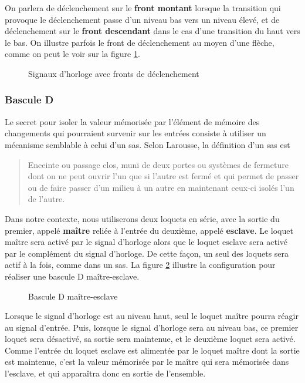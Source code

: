 \documentclass[11pt]{article}
\begin{document}
On parlera de déclenchement sur le \textbf{front montant} lorsque la
transition qui provoque le déclenchement passe d'un niveau bas vers un
niveau élevé, et de déclenchement sur le \textbf{front descendant} dans le
cas d'une transition du haut vers le bas.  On illustre parfois le
front de déclenchement au moyen d'une flèche, comme on peut le voir
sur la figure \ref{fig:org8dda642}.

\begin{figure}[htbp]
\centering

\caption{\label{fig:org8dda642}Signaux d'horloge avec fronts de déclenchement}
\end{figure}

\subsubsection{Bascule D}
\label{sec:orga245299}

Le secret pour isoler la valeur mémorisée par l'élément de mémoire des
changements qui pourraient survenir sur les entrées consiste à
utiliser un mécanisme semblable à celui d'un sas. Selon Larousse, la
définition d'un sas est

\begin{quote}
Enceinte ou passage clos, muni de deux portes ou systèmes de fermeture
dont on ne peut ouvrir l'un que si l'autre est fermé et qui permet de
passer ou de faire passer d'un milieu à un autre en maintenant ceux-ci
isolés l'un de l'autre.
\end{quote}

Dans notre contexte, nous utiliserons deux loquets en série, avec la
sortie du premier, appelé \textbf{maître} reliée à l'entrée du deuxième,
appelé \textbf{esclave}. Le loquet maître sera activé par le signal d'horloge
alors que le loquet esclave sera activé par le complément du signal
d'horloge. De cette façon, un seul des loquets sera actif à la fois,
comme dans un sas. La figure \ref{fig:orga594e57} illustre la
configuration pour réaliser une bascule D maître-esclave.

\begin{figure}[htbp]
\centering

\caption{\label{fig:orga594e57}Bascule D maître-esclave}
\end{figure}

Lorsque le signal d'horloge est au niveau haut, seul le loquet maître
pourra réagir au signal d'entrée. Puis, lorsque le signal d'horloge
sera au niveau bas, ce premier loquet sera désactivé, sa sortie sera
maintenue, et le deuxième loquet sera activé. Comme l'entrée du loquet
esclave est alimentée par le loquet maître dont la sortie est
maintenue, c'est la valeur mémorisée par le maître qui sera mémorisée
dans l'esclave, et qui apparaîtra donc en sortie de l'ensemble.
\end{document}
